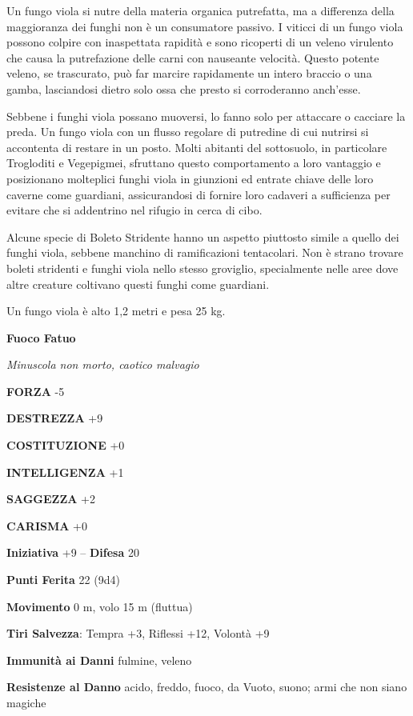 \begin{multicols}{2}
Un fungo viola si nutre della materia organica putrefatta, ma a differenza della maggioranza dei funghi non è un consumatore passivo. I viticci di un fungo viola possono colpire con inaspettata rapidità e sono ricoperti di un veleno virulento che causa la putrefazione delle carni con nauseante velocità. Questo potente veleno, se trascurato, può far marcire rapidamente un intero braccio o una gamba, lasciandosi dietro solo ossa che presto si corroderanno anch'esse.

Sebbene i funghi viola possano muoversi, lo fanno solo per attaccare o cacciare la preda. Un fungo viola con un flusso regolare di putredine di cui nutrirsi si accontenta di restare in un posto. Molti abitanti del sottosuolo, in particolare Trogloditi e Vegepigmei, sfruttano questo comportamento a loro vantaggio e posizionano molteplici funghi viola in giunzioni ed entrate chiave delle loro caverne come guardiani, assicurandosi di fornire loro cadaveri a sufficienza per evitare che si addentrino nel rifugio in cerca di cibo.

Alcune specie di Boleto Stridente hanno un aspetto piuttosto simile a quello dei funghi viola, sebbene manchino di ramificazioni tentacolari. Non è strano trovare boleti stridenti e funghi viola nello stesso groviglio, specialmente nelle aree dove altre creature coltivano questi funghi come guardiani.

Un fungo viola è alto 1,2 metri e pesa 25 kg.


\medskip{}\textbf{Fuoco Fatuo}

\textit{Minuscola non morto, caotico malvagio}

\textbf{FORZA} -5

\textbf{DESTREZZA} +9

\textbf{COSTITUZIONE} +0

\textbf{INTELLIGENZA} +1

\textbf{SAGGEZZA} +2

\textbf{CARISMA} +0

\textbf{Iniziativa} +9 -- \textbf{Difesa} 20

\textbf{Punti Ferita} 22 (9d4)

\textbf{Movimento} 0 m, volo 15 m (fluttua)

\textbf{Tiri Salvezza}: Tempra +3, Riflessi +12, Volontà +9

\textbf{Immunità ai Danni} fulmine, veleno

\textbf{Resistenze al Danno} acido, freddo, fuoco, da Vuoto, suono; armi che non siano magiche


\end{multicols}
